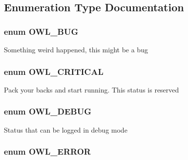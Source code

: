 \subsection{Enumeration Type Documentation}
\hypertarget{owl_8severitycodes_8php_97e9838587d4386a48d7e40020bf0a7f}{
\subsubsection{\setlength{\rightskip}{0pt plus 5cm}enum {\bf OWL\_\-BUG}}}
\label{owl_8severitycodes_8php_97e9838587d4386a48d7e40020bf0a7f}


Something weird happened, this might be a bug \hypertarget{owl_8severitycodes_8php_4628d2e3b0d08692a62a1b8cad05465b}{
\subsubsection{\setlength{\rightskip}{0pt plus 5cm}enum {\bf OWL\_\-CRITICAL}}}
\label{owl_8severitycodes_8php_4628d2e3b0d08692a62a1b8cad05465b}


Pack your backs and start running. This status is reserved \hypertarget{owl_8severitycodes_8php_df6a439e74801dd83160f085e9af5546}{
\subsubsection{\setlength{\rightskip}{0pt plus 5cm}enum {\bf OWL\_\-DEBUG}}}
\label{owl_8severitycodes_8php_df6a439e74801dd83160f085e9af5546}


Status that can be logged in debug mode \hypertarget{owl_8severitycodes_8php_b57d46c4dff0628f7f46aa11db9325c9}{
\subsubsection{\setlength{\rightskip}{0pt plus 5cm}enum {\bf OWL\_\-ERROR}}}
\label{owl_8severitycodes_8php_b57d46c4dff0628f7f46aa11db9325c9}


